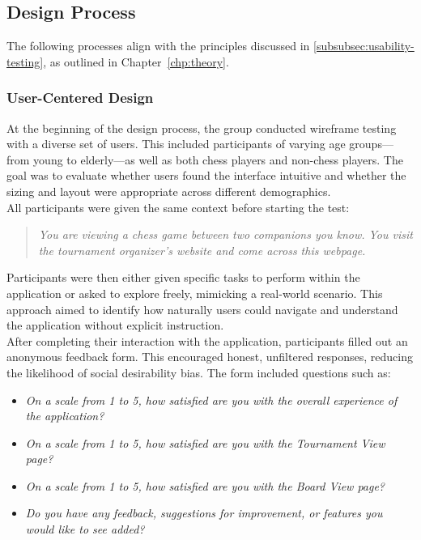 \subsection{Design Process}
\label{subsec:design-process}

The following processes align with the principles discussed in \ref{subsubsec:usability-testing}, as outlined in Chapter~\ref{chp:theory}.

\subsubsection*{User-Centered Design}
\label{subsubsec:user-centered-design}

At the beginning of the design process, the group conducted wireframe testing with a diverse set of users. This included participants of varying age groups—from young to elderly—as well as both chess players and non-chess players. The goal was to evaluate whether users found the interface intuitive and whether the sizing and layout were appropriate across different demographics. \\

All participants were given the same context before starting the test: 

\begin{quote}
\textit{You are viewing a chess game between two companions you know. You visit the tournament organizer's website and come across this webpage.}
\end{quote}

Participants were then either given specific tasks to perform within the application or asked to explore freely, mimicking a real-world scenario. This approach aimed to identify how naturally users could navigate and understand the application without explicit instruction. \\

After completing their interaction with the application, participants filled out an anonymous feedback form. This encouraged honest, unfiltered responses, reducing the likelihood of social desirability bias. The form included questions such as:

\begin{itemize}
    \item \textit{On a scale from 1 to 5, how satisfied are you with the overall experience of the application?}
    \item \textit{On a scale from 1 to 5, how satisfied are you with the Tournament View page?}
    \item \textit{On a scale from 1 to 5, how satisfied are you with the Board View page?}
    \item \textit{Do you have any feedback, suggestions for improvement, or features you would like to see added?}
\end{itemize}

